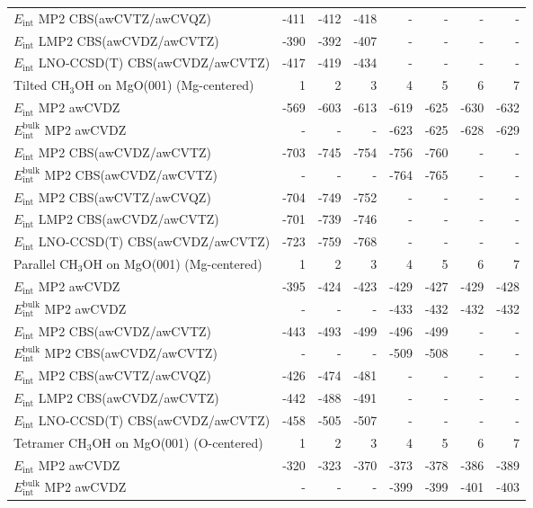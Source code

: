 \begin{longtable}{lrrrrrrr}
$E_\text{int}$ MP2 CBS(awCVTZ/awCVQZ) & -411 & -412 & -418 & - & - & - & - \\
$E_\text{int}$ LMP2 CBS(awCVDZ/awCVTZ) & -390 & -392 & -407 & - & - & - & - \\
$E_\text{int}$ LNO-CCSD(T) CBS(awCVDZ/awCVTZ) & -417 & -419 & -434 & - & - & - & - \\
\toprule
Tilted CH$_3$OH on MgO(001) (Mg-centered) & 1 & 2 & 3 & 4 & 5 & 6 & 7 \\ 
\midrule
$E_\text{int}$ MP2 awCVDZ & -569 & -603 & -613 & -619 & -625 & -630 & -632 \\
$E_\text{int}^\text{bulk}$ MP2 awCVDZ & - & - & - & -623 & -625 & -628 & -629 \\
$E_\text{int}$ MP2 CBS(awCVDZ/awCVTZ) & -703 & -745 & -754 & -756 & -760 & - & - \\
$E_\text{int}^\text{bulk}$ MP2 CBS(awCVDZ/awCVTZ) & - & - & - & -764 & -765 & - & - \\
$E_\text{int}$ MP2 CBS(awCVTZ/awCVQZ) & -704 & -749 & -752 & - & - & - & - \\
$E_\text{int}$ LMP2 CBS(awCVDZ/awCVTZ) & -701 & -739 & -746 & - & - & - & - \\
$E_\text{int}$ LNO-CCSD(T) CBS(awCVDZ/awCVTZ) & -723 & -759 & -768 & - & - & - & - \\
\toprule
Parallel CH$_3$OH on MgO(001) (Mg-centered) & 1 & 2 & 3 & 4 & 5 & 6 & 7 \\ 
\midrule
$E_\text{int}$ MP2 awCVDZ & -395 & -424 & -423 & -429 & -427 & -429 & -428 \\
$E_\text{int}^\text{bulk}$ MP2 awCVDZ & - & - & - & -433 & -432 & -432 & -432 \\
$E_\text{int}$ MP2 CBS(awCVDZ/awCVTZ) & -443 & -493 & -499 & -496 & -499 & - & - \\
$E_\text{int}^\text{bulk}$ MP2 CBS(awCVDZ/awCVTZ) & - & - & - & -509 & -508 & - & - \\
$E_\text{int}$ MP2 CBS(awCVTZ/awCVQZ) & -426 & -474 & -481 & - & - & - & - \\
$E_\text{int}$ LMP2 CBS(awCVDZ/awCVTZ) & -442 & -488 & -491 & - & - & - & - \\
$E_\text{int}$ LNO-CCSD(T) CBS(awCVDZ/awCVTZ) & -458 & -505 & -507 & - & - & - & - \\
\toprule
Tetramer CH$_3$OH on MgO(001) (O-centered) & 1 & 2 & 3 & 4 & 5 & 6 & 7 \\ 
\midrule
$E_\text{int}$ MP2 awCVDZ & -320 & -323 & -370 & -373 & -378 & -386 & -389 \\
$E_\text{int}^\text{bulk}$ MP2 awCVDZ & - & - & - & -399 & -399 & -401 & -403 \\

\end{longtable}
